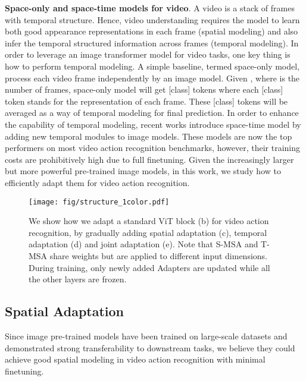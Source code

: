 \documentclass{article} \usepackage{iclr2023_conference,times}
\begin{document}
	\textbf{Space-only and space-time models for video}.
	A video is a stack of frames with temporal structure. 
	Hence, video understanding requires the model to learn both good appearance representations in each frame (spatial modeling) and also infer the temporal structured information across frames (temporal modeling).
	In order to leverage an image transformer model for video tasks, one key thing is how to perform temporal modeling. 
	A simple baseline, termed space-only model, process each video frame independently by an image model.
	Given , where  is the number of frames, space-only model will get  [class] tokens where each [class] token stands for the representation of each frame. These  [class] tokens will be averaged as a way of temporal modeling for final prediction. 
	In order to enhance the capability of temporal modeling, recent works \citep{timesformer,arnab2021vivit,zhang2021vidtr} introduce space-time model by adding new temporal modules to image models. 
	These models are now the top performers on most video action recognition benchmarks, however, their training costs are prohibitively high due to full finetuning. 
	Given the increasingly larger but more powerful pre-trained image models, in this work, we study how to efficiently adapt them for video action recognition. 






	
	\begin{figure*}[t]
		
		\centering
		\texttt{[image: fig/structure\_1color.pdf]}
		\vspace{-2pt}
		\caption{We show how we adapt a standard ViT block (b) for video action recognition, by gradually adding spatial adaptation (c), temporal adaptation (d) and joint adaptation (e). 
Note that S-MSA and T-MSA share weights but are applied to different input dimensions. During training, only newly added Adapters are updated while all the other layers are frozen.}
		\label{fig:adapter}
		\vspace{-20pt}
	\end{figure*}
	
	\vspace{-10pt}
	\subsection{Spatial Adaptation}
	\label{subsec:spatial adapter}
	Since image pre-trained models have been trained on large-scale datasets and demonstrated strong transferability to downstream tasks, we believe they could achieve good spatial modeling in video action recognition with minimal finetuning. 
	
\end{document}
